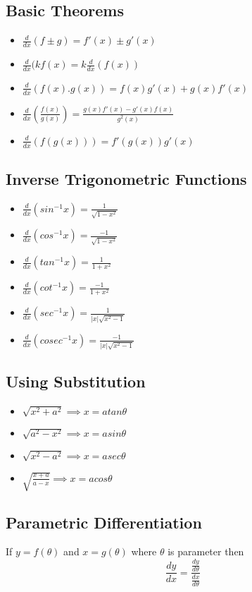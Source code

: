 \documentclass[12pt]{article}
\begin{document}
\subsection{Basic Theorems}
\begin{itemize}
\item $\frac{d}{dx} (f \pm g)=f'(x) \pm g'(x)$
\item $\frac{d}{dx} (kf(x)=k\frac{d}{dx}(f(x))$
\item $\frac{d}{dx} (f(x).g(x))=f(x)g'(x)+g(x)f'(x)$
\item $\frac{d}{dx} (\frac{f(x)}{g(x)})=\frac{g(x)f'(x)-g'(x)f(x)}{g^2(x)}$
\item $\frac{d}{dx} (f(g(x)))=f'(g(x))g'(x)$
\end{itemize}
\subsection{Inverse Trigonometric Functions}
\begin{itemize}
\item $\frac{d}{dx} (sin^{-1}x)=\frac{1}{\sqrt{1-x^2}}$
\item $\frac{d}{dx} (cos^{-1}x)=\frac{-1}{\sqrt{1-x^2}}$
\item $\frac{d}{dx} (tan^{-1}x)=\frac{1}{1+x^2}$
\item $\frac{d}{dx} (cot^{-1}x)=\frac{-1}{1+x^2}$
\item $\frac{d}{dx} (sec^{-1}x)=\frac{1}{|x| \sqrt{x^2-1}}$
\item $\frac{d}{dx} (cosec^{-1}x)=\frac{-1}{|x| \sqrt{x^2-1}}$
\end{itemize}
\subsection{Using Substitution}
\begin{itemize}
\item  $\sqrt{x^2+a^2} \implies x=atan \theta$
\item  $\sqrt{a^2-x^2} \implies x=asin \theta$
\item  $\sqrt{x^2-a^2} \implies x=asec \theta$
\item  $\sqrt{\frac{x+a}{a-x}} \implies x=acos \theta$
\end{itemize}
\subsection{Parametric Differentiation}
If $y=f(\theta)$ and $x=g(\theta)$ where $\theta$ is parameter then
$$\frac{dy}{dx} = \frac{\frac{dy}{d\theta}}{\frac{dx}{d\theta}}$$
\end{document}

